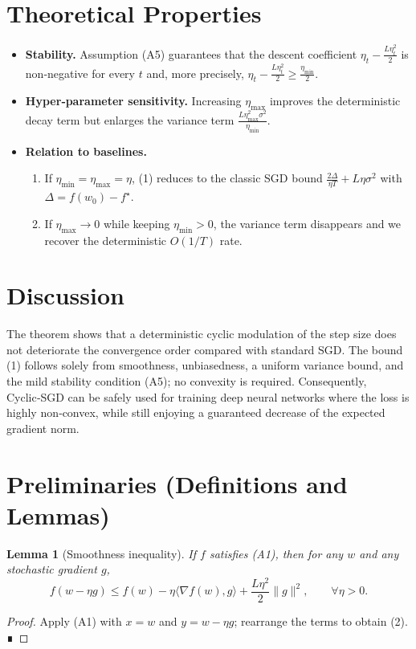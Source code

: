 \documentclass[11pt]{article}
\newtheorem{lemma}{Lemma}
\begin{document}
\section*{Theoretical Properties}
\begin{itemize}
    \item \textbf{Stability.} Assumption (A5) guarantees that the descent coefficient
    $\eta_{t}-\frac{L\eta_{t}^{2}}{2}$ is non‑negative for every $t$ and, more precisely,
    $\eta_{t}-\frac{L\eta_{t}^{2}}{2}\ge \frac{\eta_{\min}}{2}$.
    \item \textbf{Hyper‑parameter sensitivity.} Increasing $\eta_{\max}$ improves the deterministic
    decay term but enlarges the variance term $\frac{L\eta_{\max}^{2}\sigma^{2}}{\eta_{\min}}$.
    \item \textbf{Relation to baselines.}
    \begin{enumerate}
        \item If $\eta_{\min}=\eta_{\max}=\eta$, (1) reduces to the classic SGD bound
        $\frac{2\Delta}{\eta T}+L\eta\sigma^{2}$ with $\Delta=f(w_{0})-f^{\star}$.
        \item If $\eta_{\max}\to0$ while keeping $\eta_{\min}>0$, the variance term disappears and we recover the deterministic $O(1/T)$ rate.
    \end{enumerate}
\end{itemize}

\section*{Discussion}
The theorem shows that a deterministic cyclic modulation of the step size does not deteriorate the convergence order compared with standard SGD. The bound (1) follows solely from smoothness, unbiasedness, a uniform variance bound, and the mild stability condition (A5); no convexity is required. Consequently, Cyclic‑SGD can be safely used for training deep neural networks where the loss is highly non‑convex, while still enjoying a guaranteed decrease of the expected gradient norm.

\section*{Preliminaries (Definitions and Lemmas)}
\begin{lemma}[Smoothness inequality]\label{lem:smooth}
If $f$ satisfies (A1), then for any $w$ and any stochastic gradient $g$,
\[
f(w-\eta g)\le f(w)-\eta\langle\nabla f(w),g\rangle+\frac{L\eta^{2}}{2}\|g\|^{2},
\qquad \forall\eta>0.
\tag{2}
\]
\end{lemma}
\begin{proof}
Apply (A1) with $x=w$ and $y=w-\eta g$; rearrange the terms to obtain (2). ∎
\end{proof}
\end{document}
